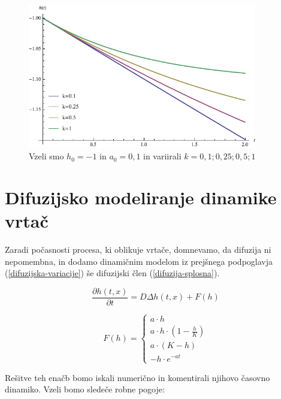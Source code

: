 \documentclass[a4paper, twoside, 12pt]{book}
\begin{document}
            \begin{figure}[h!]
              \begin{center}
                \includegraphics[width=10cm]{slike/gompertzova-rast}
              \end{center}
              \caption{Vzeli smo $h_0=-1$ in $a_0=0,1$ in variirali $k=0,1;0,25;0,5;1$}
              \label{fig:gompertzova-rast}
            \end{figure}

            \section{Difuzijsko modeliranje dinamike vrtač}

            Zaradi počasnosti procesa, ki oblikuje vrtače, domnevamo, da difuzija ni nepomembna, in dodamo dinamičnim modelom iz prejšnega podpoglavja  (\ref{difuzijska-variacije}) še difuzijski člen (\ref{difuzija-splosna}).

            \begin{equation}
              \frac{ \partial h(t,x) }{ \partial t} = D \Delta h(t,x) + F(h)
              \label{difuzija-splosna}
            \end{equation}

          \begin{equation}
            F(h) = \left \{ \begin{array}{lr} 
            a \cdot h \\
            a \cdot h \cdot (1 - \frac{h}{K}) \\
            a \cdot (K - h) \\
            - h \cdot e^{-a t}
            \end{array} \right. 
            \label{difuzijska-variacije}
          \end{equation}

          Rešitve teh enačb bomo iskali numerično in komentirali njihovo časovno dinamiko. Vzeli bomo sledeče robne pogoje:
\end{document}
